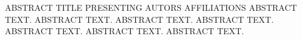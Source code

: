 \begin{conf-abstract}
{ABSTRACT TITLE}
{PRESENTING AUTORS}
{AFFILIATIONS}
{ABSTRACT TEXT. ABSTRACT TEXT. ABSTRACT TEXT. ABSTRACT TEXT. ABSTRACT TEXT. ABSTRACT TEXT. ABSTRACT TEXT.}
\end{conf-abstract}
